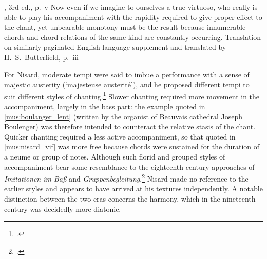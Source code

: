 %
  {\cite{WittOrganumcomitansad1881}, 3rd ed., p.~v}
{Now even if we imagine to ourselves a true virtuoso, who really is able to play his accompaniment with the rapidity required to give proper effect to the chant, yet unbearable monotony must be the result because innumerable chords and chord relations of the same kind are constantly occurring.}
  {Translation on similarly paginated English-language supplement and translated by H.\ S.\ Butterfield, p.~iii}%
\noindent%

For Nisard, moderate tempi were said to imbue a performance with a sense of majestic austerity (`majesteuse austerité'), and he proposed different tempi to suit different styles of chanting.\footcites[cols~75--6]{NisardAccompagnementplainchant1854}[257--8]{GrandjeanOrgelundOper2015}
Slower chanting required more movement in the accompaniment, largely in the bass part: the example quoted in \cref{mus:boulanger_lent} (written by the organist of Beauvais cathedral Joseph Boulenger) was therefore intended to counteract the relative stasis of the chant.
Quicker chanting required a less active accompaniment, so that quoted in \cref{mus:nisard_vif} was more free because chords were sustained for the duration of a neume or group of notes.
Although such florid and grouped styles of accompaniment bear some resemblance to the eighteenth-century approaches of \textit{Imitationen im Baß} and \textit{Gruppenbegleitung},\footcite[88--101]{SoehnerGeschichteBegleitunggregorianischen1931} Nisard made no reference to the earlier styles and appears to have arrived at his textures independently.
A notable distinction between the two eras concerns the harmony, which in the nineteenth century was decidedly more diatonic.

